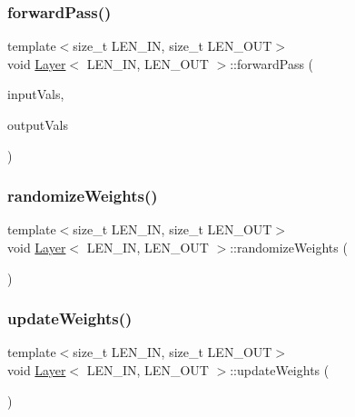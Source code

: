 \mbox{\label{class_layer_adb74d1888a61fe0a0e13cebe9b300bb2}} 
\subsubsection{\texorpdfstring{forward\+Pass()}{forwardPass()}}
{\footnotesize\ttfamily template$<$size\+\_\+t L\+E\+N\+\_\+\+IN, size\+\_\+t L\+E\+N\+\_\+\+O\+UT$>$ \\
void \hyperlink{class_layer}{Layer}$<$ L\+E\+N\+\_\+\+IN, L\+E\+N\+\_\+\+O\+UT $>$\+::forward\+Pass (\begin{DoxyParamCaption}\item[{array$<$ double, L\+E\+N\+\_\+\+IN $>$}]{input\+Vals,  }\item[{array$<$ double, L\+E\+N\+\_\+\+O\+UT $>$}]{output\+Vals }\end{DoxyParamCaption})\hspace{0.3cm}{\ttfamily [inline]}}

\mbox{\label{class_layer_aee349ae2e2c54fa8079cc564e84cb938}} 
\subsubsection{\texorpdfstring{randomize\+Weights()}{randomizeWeights()}}
{\footnotesize\ttfamily template$<$size\+\_\+t L\+E\+N\+\_\+\+IN, size\+\_\+t L\+E\+N\+\_\+\+O\+UT$>$ \\
void \hyperlink{class_layer}{Layer}$<$ L\+E\+N\+\_\+\+IN, L\+E\+N\+\_\+\+O\+UT $>$\+::randomize\+Weights (\begin{DoxyParamCaption}{ }\end{DoxyParamCaption})\hspace{0.3cm}{\ttfamily [inline]}}

\mbox{\label{class_layer_aa490ca327cae4e71d017d444c2c87468}} 
\subsubsection{\texorpdfstring{update\+Weights()}{updateWeights()}}
{\footnotesize\ttfamily template$<$size\+\_\+t L\+E\+N\+\_\+\+IN, size\+\_\+t L\+E\+N\+\_\+\+O\+UT$>$ \\
void \hyperlink{class_layer}{Layer}$<$ L\+E\+N\+\_\+\+IN, L\+E\+N\+\_\+\+O\+UT $>$\+::update\+Weights (\begin{DoxyParamCaption}{ }\end{DoxyParamCaption})\hspace{0.3cm}{\ttfamily [inline]}}



